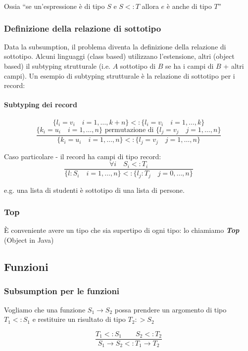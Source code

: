\documentclass[a4paper,10pt]{article}
\begin{document}
Ossia ``se un'espressione è di tipo $S$ e $S<:T$ allora $e$ è anche di tipo $T$''
\subsubsection{Definizione della relazione di sottotipo}
Data la subsumption, il problema diventa la definizione della relazione di sottotipo. Alcuni linguaggi (class based) utilizzano l'estensione, altri (object based) il subtyping strutturale (i.e. $A$ sottotipo di $B$ se ha i campi di $B$ + altri campi). Un esempio di subtyping strutturale è la relazione di sottotipo per i record:
\paragraph{Subtyping dei record}
    \[ \{ l_i = v_i\quad i = 1, \hdots, k+n \} <: \{ l_i = v_i \quad i = 1, \hdots, k \} \]\smallskip
    \[ \dfrac{\{ k_i = u_i\quad i = 1, \hdots, n \} \text{ permutazione di }\{ l_j = v_j \quad j = 1, \hdots, n \}}{\{ k_i = u_i\quad i = 1, \hdots, n \} <: \{ l_j = v_j \quad j = 1, \hdots, n \}} \]\smallskip

Caso particolare - il record ha campi di tipo record:
    \[ \dfrac{\forall i \quad S_i <: T_i}{\{ l : S_i\quad i = 1, \hdots, n \} <: \{ l_j : T_j\quad j = 0, \hdots, n \}} \]
    
e.g. una lista di studenti è sottotipo di una lista di persone.

\subsubsection{Top}
È conveniente avere un tipo che sia supertipo di ogni tipo: lo chiamiamo \textit{\textbf{Top}} (Object in Java)\newpage

\subsection{Funzioni}
\subsubsection{Subsumption per le funzioni}
Vogliamo che una funzione $S_1 \to S_2$ possa prendere un argomento di tipo $T_1 <: S_1$ e restituire un risultato di tipo $T_2 :> S_2$

\[ \dfrac{T_1 <: S_1 \quad\quad S_2 <: T_2}{S_1 \to S_2 <: T_1 \to T_2} \]
\end{document}
